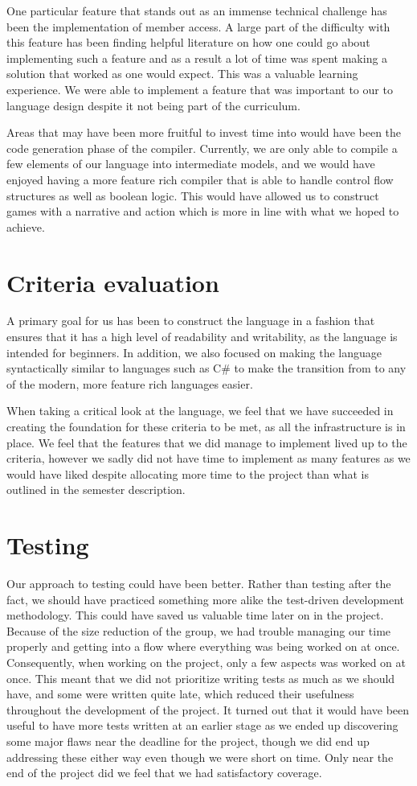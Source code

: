 One particular feature that stands out as an immense technical challenge has been the implementation of member access. A large part of the difficulty with this feature has been finding helpful literature on how one could go about implementing such a feature and as a result a lot of time was spent making a solution that worked as one would expect. This was a valuable learning experience. We were able to implement a feature that was important to our to language design despite it not being part of the curriculum.

Areas that may have been more fruitful to invest time into would have been the code generation phase of the compiler. Currently, we are only able to compile a few elements of our language into intermediate models, and we would have enjoyed having a more feature rich compiler that is able to handle control flow structures as well as boolean logic. This would have allowed us to construct games with a narrative and action which is more in line with what we hoped to achieve.

\section{Criteria evaluation}
A primary goal for us has been to construct the language in a fashion that ensures that it has a high level of readability and writability, as the language is intended for beginners. In addition, we also focused on making the language syntactically similar to languages such as C\# to make the transition from \dazel{} to any of the modern, more feature rich languages easier. 

When taking a critical look at the language, we feel that we have succeeded in creating the foundation for these criteria to be met, as all the infrastructure is in place. 
We feel that the features that we did manage to implement lived up to the criteria, however we sadly did not have time to implement as many features as we would have liked despite allocating more time to the project than what is outlined in the semester description.

\section{Testing}
Our approach to testing could have been better. Rather than testing after the fact, we should have practiced something more alike the test-driven development methodology. This could have saved us valuable time later on in the project.
Because of the size reduction of the group, we had trouble managing our time properly and getting into a flow where everything was being worked on at once.
Consequently, when working on the project, only a few aspects was worked on at once.
This meant that we did not prioritize writing tests as much as we should have, and some were written quite late, which reduced their usefulness throughout the development of the project. 
It turned out that it would have been useful to have more tests written at an earlier stage as we ended up discovering some major flaws near the deadline for the project, though we did end up addressing these either way even though we were short on time. 
Only near the end of the project did we feel that we had satisfactory coverage.

